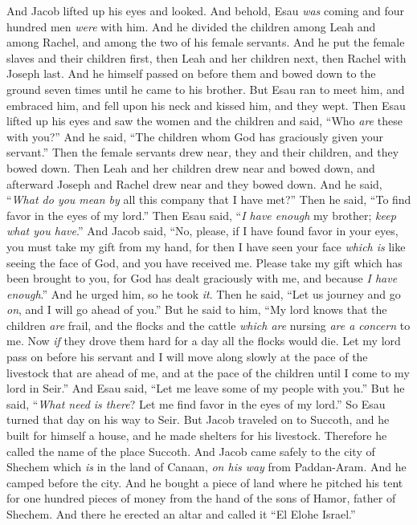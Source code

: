 \begin{biblechapter} %
 And Jacob lifted up his eyes and looked. And behold, Esau \textit{was} coming and four hundred men \textit{were} with him. And he divided the children among Leah and among Rachel, and among the two of his female servants.
\verse And he put the female slaves and their children first, then Leah and her children next, then Rachel with Joseph last.
\verse And he himself passed on before them and bowed down to the ground seven times until he came to his brother.
\verse But Esau ran to meet him, and embraced him, and fell upon his neck and kissed him, and they wept.
\verse Then Esau lifted up his eyes and saw the women and the children and said, “Who \textit{are} these with you?” And he said, “The children whom God has graciously given your servant.”
\verse Then the female servants drew near, they and their children, and they bowed down.
\verse Then Leah and her children drew near and bowed down, and afterward Joseph and Rachel drew near and they bowed down.
\verse And he said, “\textit{What do you mean by} all this company that I have met?” Then he said, “To find favor in the eyes of my lord.”
\verse Then Esau said, “\textit{I have enough} my brother; \textit{keep what you have}.”
\verse And Jacob said, “No, please, if I have found favor in your eyes, you must take my gift from my hand, for then I have seen your face \textit{which is} like seeing the face of God, and you have received me.
\verse Please take my gift which has been brought to you, for God has dealt graciously with me, and because \textit{I have enough}.” And he urged him, so he took \textit{it}.
\verse Then he said, “Let us journey and go \textit{on}, and I will go ahead of you.”
\verse But he said to him, “My lord knows that the children \textit{are} frail, and the flocks and the cattle \textit{which are} nursing \textit{are a concern} to me. Now \textit{if} they drove them hard for a day all the flocks would die.
\verse Let my lord pass on before his servant and I will move along slowly at the pace of the livestock that are ahead of me, and at the pace of the children until I come to my lord in Seir.”
\verse And Esau said, “Let me leave some of my people with you.” But he said, “\textit{What need is there}? Let me find favor in the eyes of my lord.”
\verse So Esau turned that day on his way to Seir.
\verse But Jacob traveled on to Succoth, and he built for himself a house, and he made shelters for his livestock. Therefore he called the name of the place Succoth.
\verse And Jacob came safely to the city of Shechem which \textit{is} in the land of Canaan, \textit{on his way} from Paddan-Aram. And he camped before the city.
\verse And he bought a piece of land where he pitched his tent for one hundred pieces of money from the hand of the sons of Hamor, father of Shechem.
\verse And there he erected an altar and called it “El Elohe Israel.”
\end{biblechapter}

